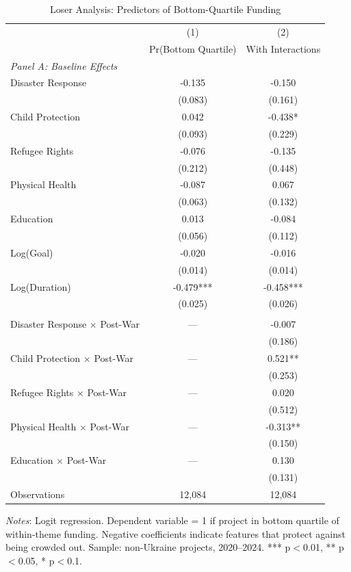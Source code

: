 \begin{table}[htbp]
\centering
\caption{Loser Analysis: Predictors of Bottom-Quartile Funding}
\label{tab:loser_analysis}
\begin{threeparttable}
\begin{tabular}{lcc}
\toprule
& (1) & (2) \\
& Pr(Bottom Quartile) & With Interactions \\
\midrule
\multicolumn{3}{l}{\textit{Panel A: Baseline Effects}} \\
Disaster Response & -0.135 & -0.150 \\
& (0.083) & (0.161) \\
Child Protection & 0.042 & -0.438* \\
& (0.093) & (0.229) \\
Refugee Rights & -0.076 & -0.135 \\
& (0.212) & (0.448) \\
Physical Health & -0.087 & 0.067 \\
& (0.063) & (0.132) \\
Education & 0.013 & -0.084 \\
& (0.056) & (0.112) \\
Log(Goal) & -0.020 & -0.016 \\
& (0.014) & (0.014) \\
Log(Duration) & -0.479*** & -0.458*** \\
& (0.025) & (0.026) \\
\addlinespace
\multicolumn{3}{l}{\textit{Panel B: Post-War Interactions}} \\
Disaster Response $\times$ Post-War & --- & -0.007 \\
& & (0.186) \\
Child Protection $\times$ Post-War & --- & 0.521** \\
& & (0.253) \\
Refugee Rights $\times$ Post-War & --- & 0.020 \\
& & (0.512) \\
Physical Health $\times$ Post-War & --- & -0.313** \\
& & (0.150) \\
Education $\times$ Post-War & --- & 0.130 \\
& & (0.131) \\
\midrule
Observations & 12,084 & 12,084 \\
\bottomrule
\end{tabular}
\begin{tablenotes}
\small
\item \textit{Notes}: Logit regression. Dependent variable = 1 if project in bottom quartile of within-theme funding. Negative coefficients indicate features that protect against being crowded out. Sample: non-Ukraine projects, 2020--2024. *** p$<$0.01, ** p$<$0.05, * p$<$0.1.
\end{tablenotes}
\end{threeparttable}
\end{table}

